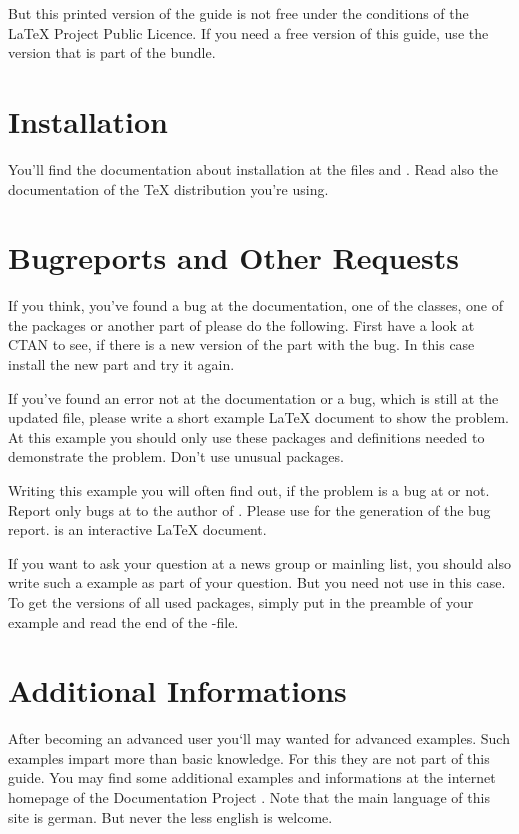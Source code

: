 %
{But this printed version of the guide is not free under the conditions of the
  LaTeX{} Project Public Licence. If you need a free version of this guide,
  use the version that is part of the \KOMAScript{} bundle.}

\section{Installation}\label{sec:introduction.installation}
You'll find the documentation about installation at the files
 and . Read also the documentation
of the \TeX{} distribution you're using.

\section{Bugreports and Other Requests}
\label{sec:introduction.errors}

If you think, you've found a bug at the documentation, one of the
\KOMAScript{} classes, one of the \KOMAScript{} packages or another
part of \KOMAScript{} please do the following. First have a look at
CTAN to see, if there is a new version of the part with the bug. In
this case install the new part and try it again.

If you've found an error not at the documentation or a bug, which is
still at the updated file, please write a short example \LaTeX{}
document to show the problem. At this example you should only use
these packages and definitions needed to demonstrate the
problem. Don't use unusual packages.

Writing this example you will often find out, if the problem is a bug
at \KOMAScript{} or not. Report only bugs at \KOMAScript{} to the
author of \KOMAScript{}. Please use  for the
generation of the bug report.  is an interactive
\LaTeX{} document.

If you want to ask your question at a news group or mainling list, you
should also write such a example as part of your question. But you
need not use  in this case. To get the versions of
all used packages, simply put  in the preamble of
your example and read the end of the -file.


\section{Additional Informations}
\label{sec:introduction.moreinfos}

After becoming an advanced user you`ll may wanted for advanced examples. Such
examples impart more than basic knowledge. For this they are not
part of this guide. You may find some additional
examples and informations at the internet homepage of the \KOMAScript{}
Documentation Project \cite{hoempage}. Note that the main language of this
site is german. But never the less english is welcome.

\endinput

